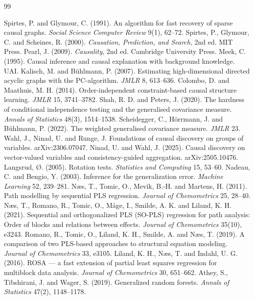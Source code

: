 \documentclass[10pt,leqno]{amsart}
\begin{document}
\begin{thebibliography}{99}

 Spirtes, P. and Glymour, C. (1991). An algorithm for fast recovery of sparse causal graphs. \emph{Social Science Computer Review} 9(1), 62--72.
 Spirtes, P., Glymour, C. and Scheines, R. (2000). \emph{Causation, Prediction, and Search}, 2nd ed. MIT Press.
 Pearl, J. (2009). \emph{Causality}, 2nd ed. Cambridge University Press.
 Meek, C. (1995). Causal inference and causal explanation with background knowledge. UAI.
 Kalisch, M. and B\"uhlmann, P. (2007). Estimating high-dimensional directed acyclic graphs with the PC-algorithm. \emph{JMLR} 8, 613--636.
 Colombo, D. and Maathuis, M. H. (2014). Order-independent constraint-based causal structure learning. \emph{JMLR} 15, 3741--3782.
 Shah, R. D. and Peters, J. (2020). The hardness of conditional independence testing and the generalised covariance measure. \emph{Annals of Statistics} 48(3), 1514--1538.
 Scheidegger, C., H\"orrmann, J. and B\"uhlmann, P. (2022). The weighted generalised covariance measure. \emph{JMLR} 23.
 Wahl, J., Ninad, U. and Runge, J. Foundations of causal discovery on groups of variables. arXiv:2306.07047.
 Ninad, U. and Wahl, J. (2025). Causal discovery on vector-valued variables and consistency-guided aggregation. arXiv:2505.10476.
 Langsrud, \O. (2005). Rotation tests. \emph{Statistics and Computing} 15, 53--60.
 Nadeau, C. and Bengio, Y. (2003). Inference for the generalization error. \emph{Machine Learning} 52, 239--281.
 N\ae s, T., Tomic, O., Mevik, B.-H. and Martens, H. (2011). Path modelling by sequential PLS regression. \emph{Journal of Chemometrics} 25, 28--40.
 N\ae s, T., Romano, R., Tomic, O., M\aa ge, I., Smilde, A. K. and Liland, K. H. (2021). Sequential and orthogonalized PLS (SO-PLS) regression for path analysis: Order of blocks and relations between effects. \emph{Journal of Chemometrics} 35(10), e3243.
 Romano, R., Tomic, O., Liland, K. H., Smilde, A. and N\ae s, T. (2019). A comparison of two PLS-based approaches to structural equation modeling. \emph{Journal of Chemometrics} 33, e3105.
 Liland, K. H., N\ae s, T. and Indahl, U. G. (2016). ROSA --- a fast extension of partial least squares regression for multiblock data analysis. \emph{Journal of Chemometrics} 30, 651--662.
 Athey, S., Tibshirani, J. and Wager, S. (2019). Generalized random forests. \emph{Annals of Statistics} 47(2), 1148--1178.

\end{thebibliography}
\end{document}

